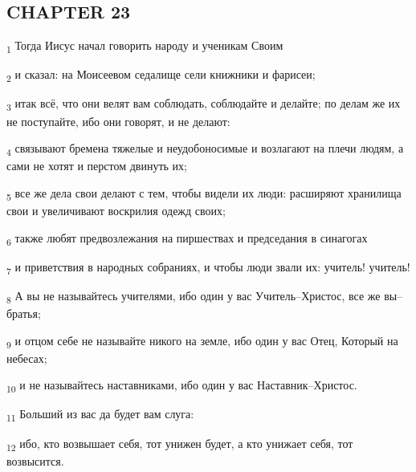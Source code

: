 \subsection{CHAPTER 23}
\begin{tcolorbox}
\textsubscript{1} Тогда Иисус начал говорить народу и ученикам Своим
\end{tcolorbox}
\begin{tcolorbox}
\textsubscript{2} и сказал: на Моисеевом седалище сели книжники и фарисеи;
\end{tcolorbox}
\begin{tcolorbox}
\textsubscript{3} итак всё, что они велят вам соблюдать, соблюдайте и делайте; по делам же их не поступайте, ибо они говорят, и не делают:
\end{tcolorbox}
\begin{tcolorbox}
\textsubscript{4} связывают бремена тяжелые и неудобоносимые и возлагают на плечи людям, а сами не хотят и перстом двинуть их;
\end{tcolorbox}
\begin{tcolorbox}
\textsubscript{5} все же дела свои делают с тем, чтобы видели их люди: расширяют хранилища свои и увеличивают воскрилия одежд своих;
\end{tcolorbox}
\begin{tcolorbox}
\textsubscript{6} также любят предвозлежания на пиршествах и председания в синагогах
\end{tcolorbox}
\begin{tcolorbox}
\textsubscript{7} и приветствия в народных собраниях, и чтобы люди звали их: учитель! учитель!
\end{tcolorbox}
\begin{tcolorbox}
\textsubscript{8} А вы не называйтесь учителями, ибо один у вас Учитель--Христос, все же вы--братья;
\end{tcolorbox}
\begin{tcolorbox}
\textsubscript{9} и отцом себе не называйте никого на земле, ибо один у вас Отец, Который на небесах;
\end{tcolorbox}
\begin{tcolorbox}
\textsubscript{10} и не называйтесь наставниками, ибо один у вас Наставник--Христос.
\end{tcolorbox}
\begin{tcolorbox}
\textsubscript{11} Больший из вас да будет вам слуга:
\end{tcolorbox}
\begin{tcolorbox}
\textsubscript{12} ибо, кто возвышает себя, тот унижен будет, а кто унижает себя, тот возвысится.
\end{tcolorbox}
